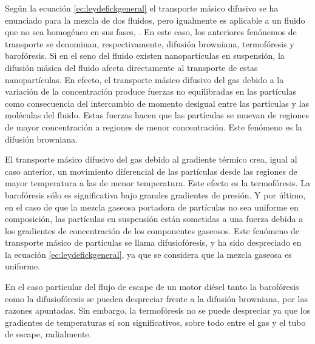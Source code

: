\par Según la ecuación \ref{ec:leydefickgeneral} el transporte másico difusivo se ha enunciado para la mezcla de dos fluidos, pero igualmente es aplicable a un fluido que no sea homogéneo en sus fases, \cite{masonetal:1962}. En este caso, los anteriores fenónemos de transporte se denominan, respectivamente,  difusión browniana,  termofóresis y  barofóresis. Si en el seno del fluido existen nanopartículas en suspensión, la difusión másica del fluido afecta directamente al transporte de estas nanopartículas. En efecto, el transporte másico difusivo del gas debido a la variación de la concentración produce fuerzas no equilibradas en las partículas como consecuencia del intercambio de momento desigual entre las partículas y las moléculas del fluido. Estas fuerzas hacen que las partículas se muevan de regiones de mayor concentración a regiones de menor concentración. Este fenómeno es la difusión browniana.

\par El transporte másico difusivo del gas debido al gradiente térmico crea, igual al caso anterior, un movimiento diferencial de las partículas desde las regiones de mayor temperatura a las de menor temperatura. Este efecto es la termofóresis. La barofóresis sólo es significativa bajo grandes gradientes de presión. Y por último, en el caso de que la mezcla gaseosa portadora de partículas no sea uniforme en composición, las partículas en suspensión están sometidas a una fuerza debida a los gradientes de concentración de los componentes gaseosos. Este fenómeno de transporte másico de partículas se llama  difusiofóresis, y ha sido despreciado en la ecuación \ref{ec:leydefickgeneral}, ya que se considera que la mezcla gaseosa es uniforme.

\par En el caso particular del flujo de escape de un motor diésel tanto la barofóresis como la difusiofóresis se pueden despreciar frente a la difusión browniana, por las razones apuntadas. Sin embargo, la termofóresis no se puede despreciar ya que los gradientes de temperaturas sí son significativos, sobre todo entre el gas y el tubo de escape, radialmente.

